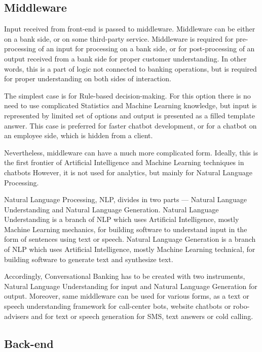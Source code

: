 \subsection*{Middleware}

Input received from front-end is passed to middleware.
Middleware can be either on a bank side, or on some third-party service.
Middleware is required for pre-processing of an input for processing on a bank side, or for post-processing of an output received from a bank side for proper customer understanding.
In other words, this is a part of logic not connected to banking operations, but is required for proper understanding on both sides of interaction.

The simplest case is for Rule-based decision-making.
For this option there is no need to use complicated Statistics and Machine Learning knowledge, but input is represented by limited set of options and output is presented as a filled template answer.
This case is preferred for faster chatbot development, or for a chatbot on an employee side, which is hidden from a client. 

Nevertheless, middleware can have a much more complicated form.
Ideally, this is the first frontier of Artificial Intelligence and Machine Learning techniques in chatbots
However, it is not used for analytics, but mainly for Natural Language Processing.

Natural Language Processing, NLP, divides in two parts — Natural Language Understanding and Natural Language Generation.
Natural Language Understanding is a branch of NLP which uses Artificial Intelligence, mostly Machine Learning mechanics, for building software to understand input in the form of sentences using text or speech.
Natural Language Generation is a branch of NLP which uses Artificial Intelligence, mostly Machine Learning technical, for building software to generate text and synthesize text.

Accordingly, Conversational Banking has to be created with two instruments, Natural Language Understanding for input and Natural Language Generation for output.
Moreover, same middleware can be used for various forms, as a text or speech understanding framework for call-center bots, website chatbots or robo-advisers and for text or speech generation for SMS, text answers or cold calling.
 

\subsection*{Back-end}

